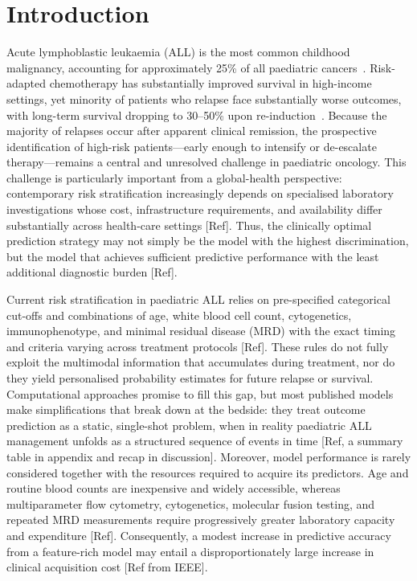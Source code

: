 \documentclass[pdflatex,sn-nature]{sn-jnl}
\begin{document}
\section{Introduction}\label{sec:intro}

Acute lymphoblastic leukaemia (ALL) is the most common childhood
malignancy, accounting for approximately 25\% of all paediatric
cancers~\cite{[CITE:Hunger2015]}.
Risk-adapted chemotherapy has substantially improved survival in
high-income settings, yet minority of patients who relapse face substantially worse outcomes, with long-term
survival dropping to 30--50\% upon re-induction~\cite{[CITE:Bhojwani2013],[CITE:Pui2008]}.
Because the majority of relapses occur after apparent clinical
remission, the prospective identification of high-risk patients—early
enough to intensify or de-escalate therapy—remains a central and
unresolved challenge in paediatric oncology. This challenge is
particularly important from a global-health perspective: contemporary
risk stratification increasingly depends on specialised laboratory
investigations whose cost, infrastructure requirements, and
availability differ substantially across health-care settings [Ref]. Thus,
the clinically optimal prediction strategy may not simply be the model
with the highest discrimination, but the model that achieves sufficient
predictive performance with the least additional diagnostic burden [Ref].

Current risk stratification in paediatric ALL relies
on pre-specified categorical cut-offs and combinations of age, white blood cell count,
cytogenetics, immunophenotype, and minimal residual disease (MRD) with the exact timing and criteria varying across treatment
protocols [Ref].
These rules do not fully exploit the multimodal information that
accumulates during treatment, nor do they yield personalised
probability estimates for future relapse or survival.
Computational approaches promise to fill this gap, but most published
models make simplifications that break down at the bedside: they treat
outcome prediction as a static, single-shot problem, when in reality
paediatric ALL management unfolds as a structured sequence of events in
time [Ref, a summary table in appendix and recap in discussion]. Moreover, model performance is rarely considered together with
the resources required to acquire its predictors. Age and routine
blood counts are inexpensive and widely accessible, whereas
multiparameter flow cytometry, cytogenetics, molecular fusion testing,
and repeated MRD measurements require progressively greater laboratory
capacity and expenditure [Ref].
Consequently, a modest increase in predictive accuracy from a
feature-rich model may entail a disproportionately large increase in
clinical acquisition cost [Ref from IEEE].
\end{document}
